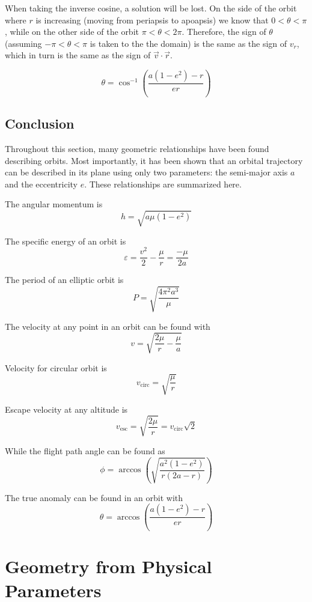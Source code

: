 \documentclass{article}
\begin{document}
When taking the inverse cosine, a solution will be lost. On the side of the orbit where $r$ is increasing (moving from periapsis to apoapsis) we know that $0<\theta<\pi$, while on the other side of the orbit $\pi<\theta<2\pi$. Therefore, the sign of $\theta$ (assuming $-\pi<\theta<\pi$ is taken to the the domain) is the same as the sign of $v_r$, which in turn is the same as the sign of $\vec{v}\cdot\vec{r}$.

\begin{equation}\label{True Anomoly Geometric}
    \theta=\cos^{-1}\left(\frac{a(1-e^2)-r}{er}\right)
\end{equation}

\bigskip\bigskip
\subsection{Conclusion}

Throughout this section, many geometric relationships have been found describing orbits. Most importantly, it has been shown that an orbital trajectory can be described in its plane using only two parameters: the semi-major axis $a$ and the eccentricity $e$. These relationships are summarized here.

\bigskip
The angular momentum is
$$h=\sqrt{a\mu(1-e^2)}$$

\bigskip
The specific energy of an orbit is
$$\varepsilon=\frac{v^2}{2}-\frac{\mu}{r}=\frac{-\mu}{2a}$$

\bigskip
The period of an elliptic orbit is
$$P=\sqrt{\frac{4\pi^2a^3}{\mu}}$$

\bigskip
The velocity at any point in an orbit can be found with
$$v=\sqrt{\frac{2\mu}{r}-\frac{\mu}{a}}$$

Velocity for circular orbit is
$$v_\text{circ}=\sqrt{\frac{\mu}{r}}$$

Escape velocity at any altitude is
$$v_\text{esc}=\sqrt{\frac{2\mu}{r}}=v_\text{circ}\sqrt{2}$$

\bigskip
While the flight path angle can be found as
$$\phi=\arccos\left(\sqrt{\frac{a^2(1-e^2)}{r(2a-r)}}\right)$$

\bigskip
The true anomaly can be found in an orbit with
$$\theta=\arccos\left(\frac{a(1-e^2)-r}{er}\right)$$

\pagebreak
\section{Geometry from Physical Parameters}
\end{document}
